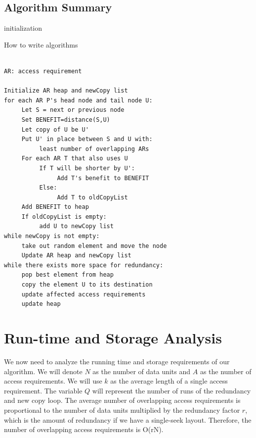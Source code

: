 \documentclass[conference]{acmsiggraph}
\begin{document}
\subsection{Algorithm Summary}

\begin{algorithm}
 initialization\;
 \caption{How to write algorithms}
\end{algorithm}

\begin{verbatim}

AR: access requirement

Initialize AR heap and newCopy list
for each AR P's head node and tail node U:
     Let S = next or previous node
     Set BENEFIT=distance(S,U)
     Let copy of U be U'
     Put U' in place between S and U with:
          least number of overlapping ARs
     For each AR T that also uses U
          If T will be shorter by U':
               Add T's benefit to BENEFIT
          Else:
               Add T to oldCopyList
     Add BENEFIT to heap
     If oldCopyList is empty:
          add U to newCopy list
while newCopy is not empty:
     take out random element and move the node
     Update AR heap and newCopy list
while there exists more space for redundancy:
     pop best element from heap
     copy the element U to its destination
     update affected access requirements
     update heap

\end{verbatim}

\section{Run-time and Storage Analysis}

We now need to analyze the running time and storage requirements of our algorithm. We will denote $N$ as the number of data units and $A$ as the number of access requirements. We will use $k$ as the average length of a single access requirement. The variable $Q$ will represent the number of runs of the redundancy and new copy loop. The average number of overlapping access requirements is proportional to the number of data units multiplied by the redundancy factor $r$, which is the amount of redundancy if we have a single-seek layout. Therefore, the number of overlapping access requirements is O(rN). 
\end{document}
